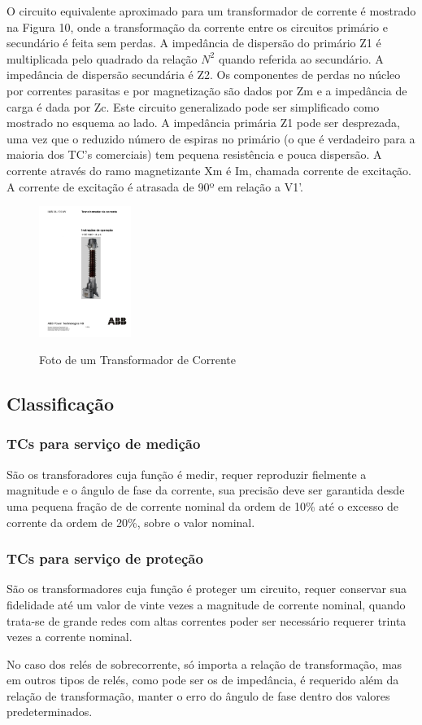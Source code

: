 \documentclass[a5paper,english,spanish,brazil]{ufsc-thesis}
\begin{document}
			O circuito equivalente aproximado para um transformador de corrente é mostrado na Figura 10, onde a transformação da corrente entre os circuitos primário e secundário é feita sem perdas. A impedância de dispersão do primário Z1 é multiplicada pelo quadrado da relação $N^{2}$ quando referida ao secundário. A impedância de dispersão secundária é Z2. Os componentes de perdas no núcleo por correntes parasitas e por magnetização são dados por Zm e a impedância de carga é dada por Zc. Este circuito generalizado pode ser simplificado como mostrado no esquema ao lado. A impedância primária Z1 pode ser desprezada, uma vez que o reduzido número de espiras no primário (o que é verdadeiro para a maioria dos TC’s comerciais) tem pequena resistência e pouca dispersão. A corrente através do ramo magnetizante Xm é Im, chamada corrente de excitação. A corrente de excitação é atrasada de 90º em relação a V1'.\par
			\begin{figure}[htb]
			  \caption{Foto de um Transformador de Corrente}
			  \centering
			  \includegraphics[width=3cm]{fototc.pdf}
			  \label{fig:fototc}
			\end{figure}

		\subsection{Classificação}
			\subsubsection{TCs para serviço de medição}
				São os transforadores cuja função é medir, requer reproduzir fielmente a magnitude e o ângulo de fase da corrente, sua precisão deve ser garantida desde uma pequena fração de de corrente nominal da ordem de 10\% até o excesso de corrente da ordem de 20\%, sobre o valor nominal.\cite{apuntesmeza}\par

			\subsubsection{TCs para serviço de proteção}
				São os transformadores cuja função é proteger um circuito, requer conservar sua fidelidade até um valor de vinte vezes a magnitude de corrente nominal, quando trata-se de grande redes com altas correntes poder ser necessário requerer trinta vezes a corrente nominal.\par
				No caso dos relés de sobrecorrente, só importa a relação de transformação, mas em outros tipos de relés, como pode ser os de impedância, é requerido além da relação de transformação, manter o erro do ângulo de fase dentro dos valores predeterminados.\cite{apuntesmeza}\par
\end{document}
